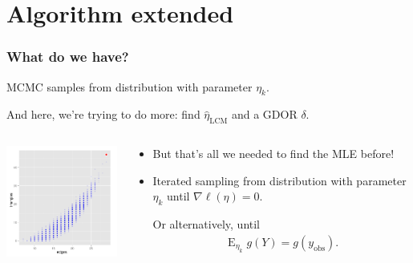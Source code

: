 \documentclass[slidestop,compress, 10pt]{beamer}
\DeclareMathOperator{\E}{E}
\newcommand{\etaLCM}{\hat{\eta}_{\textrm{LCM}}}
\newcommand{\yobs}{y_{\text{obs}}}
\begin{document}
\section{Algorithm extended}
\frame
{
\frametitle{What do we have?}
MCMC samples from distribution with parameter $\eta_k$.  

And here, we're trying to do more: find $\etaLCM$ and 
a GDOR $\delta$.
\vspace{1ex}

\begin{columns}[t]
\begin{column}[T]{0.4\textwidth}
\includegraphics[width=2in]{MCsample-bare}
\end{column}

\begin{column}[r]{0.6\textwidth}
\begin{itemize}
\item But that's all we needed to find the MLE before! 


\item Iterated sampling from distribution with parameter $\eta_k$ until $\nabla \ell(\eta) = 0$.

Or alternatively, until
\begin{align*}
	\E_{\eta_k} g(Y) = g(\yobs).
\end{align*}

\end{itemize}
\end{column}
\end{columns}
}
\end{document}
